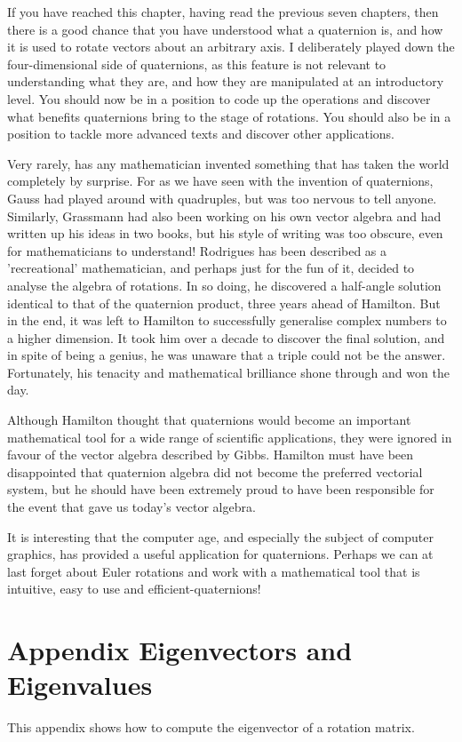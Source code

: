 
If you have reached this chapter, having read the previous seven chapters, then there is a good chance that you have understood what a quaternion is, and how it is used to rotate vectors about an arbitrary axis. I deliberately played down the four-dimensional side of quaternions, as this feature is not relevant to understanding what they are, and how they are manipulated at an introductory level. You should now be in a position to code up the operations and discover what benefits quaternions bring to the stage of rotations. You should also be in a position to tackle more advanced texts and discover other applications.

Very rarely, has any mathematician invented something that has taken the world completely by surprise. For as we have seen with the invention of quaternions, Gauss had played around with quadruples, but was too nervous to tell anyone. Similarly, Grassmann had also been working on his own vector algebra and had written up his ideas in two books, but his style of writing was too obscure, even for mathematicians to understand! Rodrigues has been described as a 'recreational' mathematician, and perhaps just for the fun of it, decided to analyse the algebra of rotations. In so doing, he discovered a half-angle solution identical to that of the quaternion product, three years ahead of Hamilton. But in the end, it was left to Hamilton to successfully generalise complex numbers to a higher dimension. It took him over a decade to discover the final solution, and in spite of being a genius, he was unaware that a triple could not be the answer. Fortunately, his tenacity and mathematical brilliance shone through and won the day.

Although Hamilton thought that quaternions would become an important mathematical tool for a wide range of scientific applications, they were ignored in favour of the vector algebra described by Gibbs. Hamilton must have been disappointed that quaternion algebra did not become the preferred vectorial system, but he should have been extremely proud to have been responsible for the event that gave us today's vector algebra.

It is interesting that the computer age, and especially the subject of computer graphics, has provided a useful application for quaternions. Perhaps we can at last forget about Euler rotations and work with a mathematical tool that is intuitive, easy to use and efficient-quaternions!

\section{Appendix
Eigenvectors and Eigenvalues}
This appendix shows how to compute the eigenvector of a rotation matrix.

